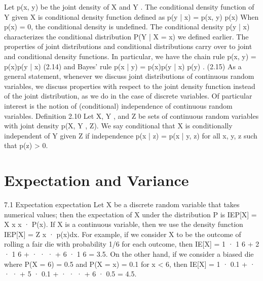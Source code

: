 Let p(x, y) be the joint density of X and Y . The conditional density function of Y given X is conditional density function defined as p(y | x) = p(x, y) p(x) When p(x) = 0, the conditional density is undefined. The conditional density p(y | x) characterizes the conditional distribution P(Y | X = x) we defined earlier. The properties of joint distributions and conditional distributions carry over to joint and conditional density functions. In particular, we have the chain rule p(x, y) = p(x)p(y | x) (2.14) and Bayes’ rule p(x | y) = p(x)p(y | x) p(y) . (2.15) As a general statement, whenever we discuss joint distributions of continuous random variables, we discuss properties with respect to the joint density function instead of the joint distribution, as we do in the case of discrete variables. Of particular interest is the notion of (conditional) independence of continuous random variables. Definition 2.10 Let X, Y , and Z be sets of continuous random variables with joint density p(X, Y , Z). We say conditional that X is conditionally independent of Y given Z if independence p(x | z) = p(x | y, z) for all x, y, z such that p(z) > 0.

\section{Expectation and Variance}

7.1 Expectation
expectation Let X be a discrete random variable that takes numerical values; then the expectation of X under the distribution P is IEP[X] = X x x · P(x). If X is a continuous variable, then we use the density function IEP[X] = Z x · p(x)dx. For example, if we consider X to be the outcome of rolling a fair die with probability 1/6 for each outcome, then IE[X] = 1 · 1 6 + 2 · 1 6 + · · · + 6 · 1 6 = 3.5. On the other hand, if we consider a biased die where P(X = 6) = 0.5 and P(X = x) = 0.1 for x < 6, then IE[X] = 1 · 0.1 + · · · + 5 · 0.1 + · · · + 6 · 0.5 = 4.5.


